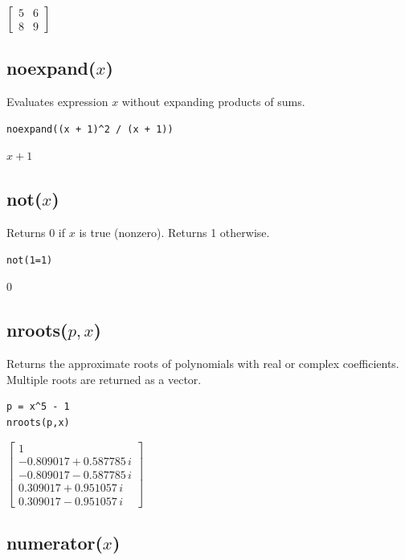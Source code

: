 \documentclass[12pt]{article}
\begin{document}
\noindent
$\displaystyle
\begin{bmatrix}
5 & 6
\\[1ex]
8 & 9
\end{bmatrix}
$

\subsection*{noexpand($x$)}

Evaluates expression $x$ without expanding products of sums.

{\color{blue}
\begin{verbatim}
noexpand((x + 1)^2 / (x + 1))
\end{verbatim}
}

\noindent
$x + 1$

\subsection*{not($x$)}

Returns 0 if $x$ is true (nonzero).
Returns 1 otherwise.

{\color{blue}
\begin{verbatim}
not(1=1)
\end{verbatim}
}

\noindent
$0$

\subsection*{nroots($p,x$)}

Returns the approximate roots of polynomials with real or complex coefficients.
Multiple roots are returned as a vector.

{\color{blue}
\begin{verbatim}
p = x^5 - 1
nroots(p,x)
\end{verbatim}
}

\noindent
$\displaystyle
\begin{bmatrix}
1
\\[1ex]
-0.809017 + 0.587785\,i
\\[1ex]
-0.809017 - 0.587785\,i
\\[1ex]
0.309017 + 0.951057\,i
\\[1ex]
0.309017 - 0.951057\,i
\end{bmatrix}
$

\subsection*{numerator($x$)}
\end{document}
